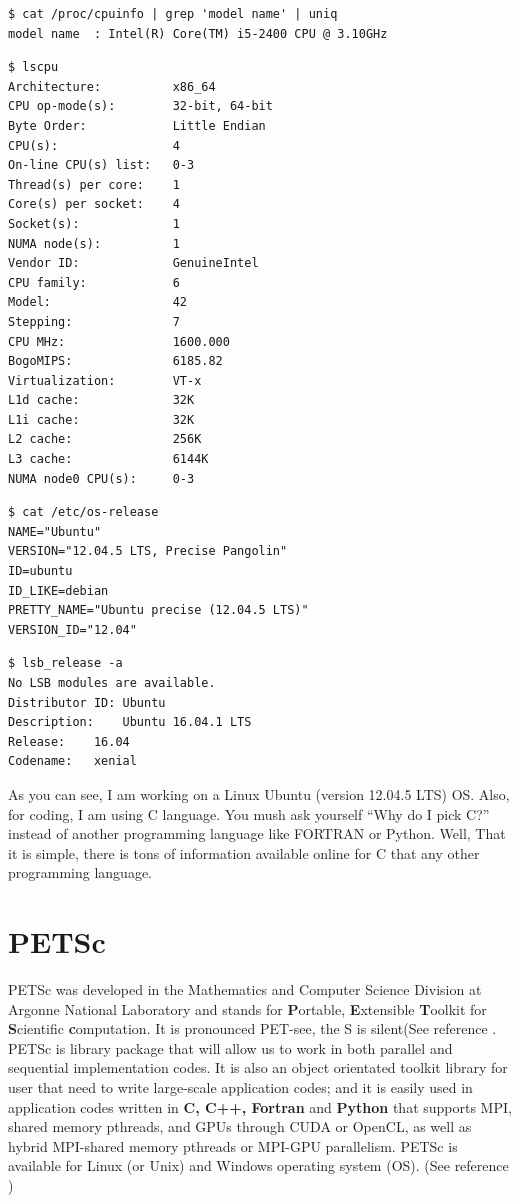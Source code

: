 \documentclass{article}
\begin{document}
\footnotesize
\begin{verbatim}
$ cat /proc/cpuinfo | grep 'model name' | uniq
model name	: Intel(R) Core(TM) i5-2400 CPU @ 3.10GHz
\end{verbatim}

\footnotesize
\begin{verbatim}
$ lscpu
Architecture:          x86_64
CPU op-mode(s):        32-bit, 64-bit
Byte Order:            Little Endian
CPU(s):                4
On-line CPU(s) list:   0-3
Thread(s) per core:    1
Core(s) per socket:    4
Socket(s):             1
NUMA node(s):          1
Vendor ID:             GenuineIntel
CPU family:            6
Model:                 42
Stepping:              7
CPU MHz:               1600.000
BogoMIPS:              6185.82
Virtualization:        VT-x
L1d cache:             32K
L1i cache:             32K
L2 cache:              256K
L3 cache:              6144K
NUMA node0 CPU(s):     0-3
\end{verbatim}
\normalsize

\footnotesize
\begin{verbatim}
$ cat /etc/os-release
NAME="Ubuntu"
VERSION="12.04.5 LTS, Precise Pangolin"
ID=ubuntu
ID_LIKE=debian
PRETTY_NAME="Ubuntu precise (12.04.5 LTS)"
VERSION_ID="12.04"
\end{verbatim}
\normalsize

\footnotesize
\begin{verbatim}
$ lsb_release -a 
No LSB modules are available.
Distributor ID:	Ubuntu
Description:	Ubuntu 16.04.1 LTS
Release:	16.04
Codename:	xenial
\end{verbatim}
\normalsize
As you can see,  I am working on a Linux Ubuntu (version 12.04.5 LTS) OS. Also, for coding, I am using C language. You mush ask yourself ``Why do I pick C?'' instead of another programming language like FORTRAN or Python. Well, That it is simple, there is tons of information available online for C that any other programming language. 

\section{PETSc}
PETSc was developed in the Mathematics and Computer Science Division at Argonne National Laboratory and stands for
\textbf{P}ortable, \textbf{E}xtensible \textbf{T}oolkit for \textbf{S}cientific \textbf{c}omputation. It is pronounced PET-see, the S is silent(See reference \cite{petsc_web_page, petsc_user_ref}.
PETSc is library package that will allow us to work in both parallel and sequential implementation codes. It is also an object orientated toolkit library for user that need to write large-scale
application codes; and it is easily used in application codes written in \textbf{C, C++, Fortran} and \textbf{Python}  that supports MPI, shared memory pthreads, and GPUs through CUDA or OpenCL,
as well as hybrid MPI-shared memory pthreads or MPI-GPU parallelism. PETSc is available for Linux (or Unix) and Windows operating system (OS).
(See reference \cite{petsc_web_page, petsc_user_ref})
\end{document}
